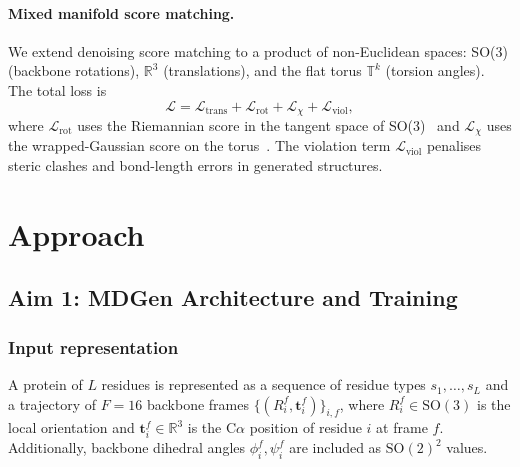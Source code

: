 \documentclass[12pt,letterpaper]{article}
\begin{document}
\paragraph{Mixed manifold score matching.}
We extend denoising score matching to a product of non-Euclidean spaces: SO(3) (backbone rotations), $\mathbb{R}^3$ (translations), and the flat torus $\mathbb{T}^k$ (torsion angles). The total loss is
\begin{equation}
\mathcal{L} = \mathcal{L}_{\text{trans}} + \mathcal{L}_{\text{rot}} + \mathcal{L}_{\chi} + \mathcal{L}_{\text{viol}},
\end{equation}
where $\mathcal{L}_{\text{rot}}$ uses the Riemannian score in the tangent space of SO(3)~\cite{de2022riemannian} and $\mathcal{L}_{\chi}$ uses the wrapped-Gaussian score on the torus~\cite{jing2024alphaflow}. The violation term $\mathcal{L}_{\text{viol}}$ penalises steric clashes and bond-length errors in generated structures.

\section{Approach}

\subsection{Aim 1: MDGen Architecture and Training}

\subsubsection*{Input representation}
A protein of $L$ residues is represented as a sequence of residue types $s_1,\ldots,s_L$ and a trajectory of $F=16$ backbone frames $\{(R_i^f, \mathbf{t}_i^f)\}_{i,f}$, where $R_i^f \in \text{SO}(3)$ is the local orientation and $\mathbf{t}_i^f \in \mathbb{R}^3$ is the C$\alpha$ position of residue $i$ at frame $f$. Additionally, backbone dihedral angles $\phi_i^f, \psi_i^f$ are included as $\text{SO}(2)^2$ values.
\end{document}
